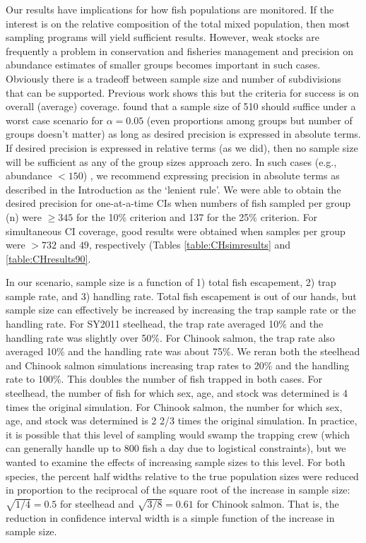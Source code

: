\documentclass[11pt]{article}
\begin{document}
Our results have implications for how fish populations are monitored. If the interest is on the relative composition of the total mixed population, then most sampling programs will yield sufficient results. However, weak stocks are frequently a problem in conservation and fisheries management and precision on abundance estimates of smaller groups becomes important in such cases.  Obviously there is a tradeoff between sample size and number of subdivisions that can be supported. Previous work \cite{Gerritsen} shows this but the criteria for success is on overall (average) coverage.  found that a sample size of 510 should suffice under a worst case scenario for $\alpha=0.05$ (even proportions among groups but number of groups doesn’t matter) as long as desired precision is expressed in absolute terms. If desired precision is expressed in relative terms (as we did), then no sample size will be sufficient as any of the group sizes approach zero. In such cases (e.g., abundance $<150$) , we recommend expressing precision in absolute terms as described in the Introduction as the `lenient rule'. We were able to obtain the desired precision for one-at-a-time CIs when numbers of fish sampled per group (n) were $\ge 345$ for the 10\% criterion and 137 for the 25\% criterion. For simultaneous CI coverage, good results were obtained when samples per group were $ > 732$ and $49$, respectively (Tables \ref{table:CHsimresults} and \ref{table:CHresults90}. 

In our scenario, sample size is a function of 1) total fish escapement, 2) trap sample rate, and 3) handling rate. Total fish escapement is out of our hands, but sample size can effectively be increased by increasing the trap sample rate or the handling rate. For SY2011 steelhead, the trap rate averaged 10\% and the handling rate was slightly over 50\%. For Chinook salmon, the trap rate also averaged 10\% and the handling rate was about 75\%. We reran both the steelhead and Chinook salmon simulations increasing trap rates to 20\% and the handling rate to 100\%. This doubles the number of fish trapped in both cases. For steelhead, the number of fish for which sex, age, and stock was determined is 4 times the original simulation. For Chinook salmon, the number for which sex, age, and stock was determined is 2 2/3 times the original simulation. In practice, it is possible that this level of sampling would swamp the trapping crew (which can generally handle up to 800 fish a day due to logistical constraints), but we wanted to examine the effects of increasing sample sizes to this level. For both species, the percent half widths relative to the true population sizes were reduced in proportion to the reciprocal of the square root of the increase in sample size: $\sqrt{1/4} = 0.5$ for steelhead and $\sqrt{3/8} = 0.61$  for Chinook salmon. That is, the reduction in confidence interval width is a simple function of the increase in sample size.
\end{document}
